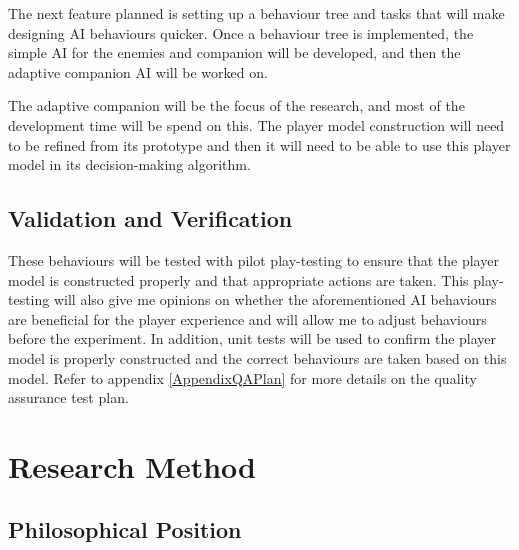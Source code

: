 \documentclass{IEEEtran}
\begin{document}
The next feature planned is setting up a behaviour tree and tasks that will make designing AI behaviours quicker. Once a behaviour tree is implemented, the simple AI for the enemies and companion will be developed, and then the adaptive companion AI will be worked on.

The adaptive companion will be the focus of the research, and most of the development time will be spend on this. The player model construction will need to be refined from its prototype and then it will need to be able to use this player model in its decision-making algorithm.

\subsection{Validation and Verification}
\label{Validation}

These behaviours will be tested with pilot play-testing to ensure that the player model is constructed properly and that appropriate actions are taken. This play-testing will also give me opinions on whether the aforementioned AI behaviours are beneficial for the player experience and will allow me to adjust behaviours before the experiment. In addition, unit tests will be used to confirm the player model is properly constructed and the correct behaviours are taken based on this model. Refer to appendix \ref{AppendixQAPlan} for more details on the quality assurance test plan.

\section{Research Method}
\label{ResearchMethod}

\subsection{Philosophical Position}
\label{PhilosophicalPosition}


\end{document}
